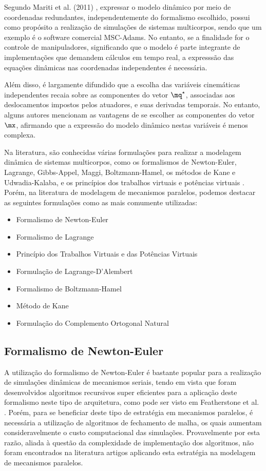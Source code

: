 \documentclass[]{politex}
\begin{document}
Segundo Mariti et al. (2011) \cite{Mariti}, expressar o modelo dinâmico por meio de coordenadas redundantes, independentemente do formalismo escolhido, possui como propósito a realização de simulações de sistemas multicorpos, sendo que um exemplo é o software comercial MSC-Adams. No entanto, se a finalidade for o controle de manipuladores, significando que o modelo é parte integrante de implementações que demandem  cálculos em tempo real, a expresssão das equações dinâmicas nas coordenadas independentes é necessária.

Além disso, é largamente difundido que a escolha das variáveis cinemáticas independentes recaia sobre as componentes do vetor $\mq^\star$, associadas aos deslocamentos impostos pelos atuadores, e suas derivadas temporais. No entanto, alguns autores \cite{Li, Khalil2} mencionam as vantagens de se escolher as componentes do vetor $\mx$, afirmando que a expressão do modelo dinâmico nestas variáveis é menos complexa.

Na literatura, são conhecidas várias formulações para realizar a modelagem dinâmica de sistemas multicorpos, como os formalismos de Newton-Euler, Lagrange, Gibbs-Appel, Maggi, Boltzmann-Hamel, os métodos de Kane e Udwadia-Kalaba, e os princípios dos trabalhos virtuais e potências virtuais \cite{23orsino}. Porém, na literatura de modelagem de mecanismos paralelos, podemos destacar as seguintes formulações como as mais comumente utilizadas:

\begin{itemize}
\item Formalismo de Newton-Euler
\item Formalismo de Lagrange
\item Princípio dos Trabalhos Virtuais e das Potências Virtuais
\item Formulação de Lagrange-D'Alembert
\item Formalismo de Boltzmann-Hamel
\item Método de Kane
\item Formulação do Complemento Ortogonal Natural
\end{itemize}

\subsection{Formalismo de Newton-Euler}

A utilização do formalismo de Newton-Euler é bastante popular para a realização de simulações dinâmicas de mecanismos seriais, tendo em vista que foram desenvolvidos algoritmos recursivos super eficientes para a aplicação deste formalismo neste tipo de arquitetura, como pode ser visto em Featherstone et al. \cite{Featherstone}. Porém, para se beneficiar deste tipo de estratégia em mecanismos paralelos, é necessária a utilização de algoritmos de fechamento de malha, os quais aumentam consideravelmente o custo computacional das simulações. Provavelmente por esta razão, aliada à questão da complexidade de implementação dos algoritmos, não foram encontrados na literatura artigos aplicando esta estratégia na modelagem de mecanismos paralelos. 
\end{document}
